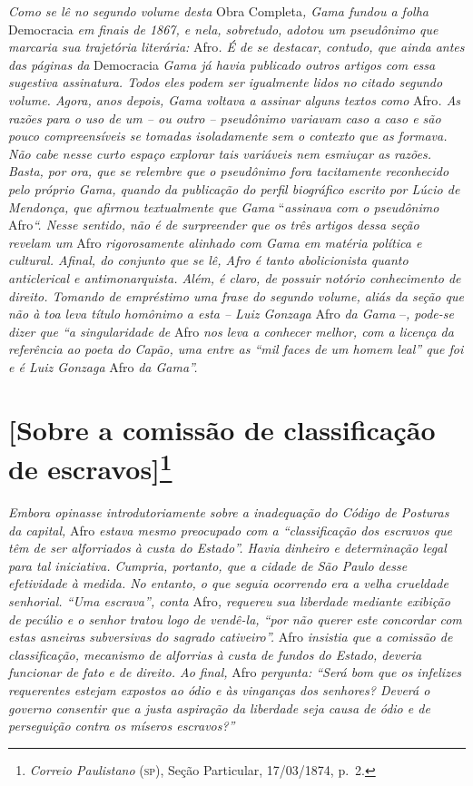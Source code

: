 \begin{argumento}
\emph{Como se lê no segundo volume desta} Obra Completa\emph{, Gama
fundou a folha} Democracia \emph{em finais de 1867, e nela, sobretudo,
adotou um pseudônimo que marcaria sua trajetória literária:} Afro\emph{.
É de se destacar, contudo, que ainda antes das páginas da} Democracia
\emph{Gama já havia publicado outros artigos com essa sugestiva
assinatura. Todos eles podem ser igualmente lidos no citado segundo
volume. Agora, anos depois, Gama voltava a assinar alguns textos como}
Afro\emph{. As razões para o uso de um -- ou outro -- pseudônimo
variavam caso a caso e são pouco compreensíveis se tomadas isoladamente
sem o contexto que as formava. Não cabe nesse curto espaço explorar tais
variáveis nem esmiuçar as razões. Basta, por ora, que se relembre que o
pseudônimo fora tacitamente reconhecido pelo próprio Gama, quando da
publicação do perfil biográfico escrito por Lúcio de Mendonça, que
afirmou textualmente que Gama} ``\emph{assinava com o pseudônimo}
Afro\emph{``. Nesse sentido, não é de surpreender que os três artigos
dessa seção revelam um} Afro \emph{rigorosamente alinhado com Gama em
matéria política e cultural. Afinal, do conjunto que se lê, Afro é
tanto} \emph{abolicionista quanto anticlerical e antimonarquista. Além,
é claro, de possuir notório conhecimento de direito. Tomando de
empréstimo uma frase do segundo volume, aliás da seção que não à toa
leva título homônimo a esta -- Luiz Gonzaga} Afro \emph{da Gama}
--\emph{, pode-se dizer que ``a singularidade de} Afro \emph{nos leva a
conhecer melhor, com a licença da referência ao poeta do Capão, uma
entre as ``mil faces de um homem leal'' que foi e é Luiz Gonzaga} Afro
\emph{da Gama''.}
\end{argumento}

\chapter{{[}Sobre a comissão de classificação 
de escravos{]}\footnote{\emph{Correio Paulistano} (\textsc{sp}), Seção Particular, 17/03/1874, p.~2.}} %

\begin{didascalia}
\emph{Embora opinasse introdutoriamente sobre a inadequação do Código de
Posturas da capital,} Afro \emph{estava mesmo preocupado com a
``classificação dos escravos que têm de ser alforriados à custa do
Estado''. Havia dinheiro e determinação legal para tal iniciativa.
Cumpria, portanto, que a cidade de São Paulo desse efetividade à medida.
No entanto, o que seguia ocorrendo era a velha crueldade senhorial. ``Uma
escrava'', conta} Afro\emph{, requereu sua liberdade mediante exibição de
pecúlio e o senhor tratou logo de vendê-la, ``por não querer este
concordar com estas asneiras subversivas do sagrado cativeiro''.} Afro
\emph{insistia que a comissão de classificação, mecanismo de alforrias à
custa de fundos do Estado, deveria funcionar de fato e de direito. Ao
final,} Afro \emph{pergunta: ``Será bom que os infelizes requerentes
estejam expostos ao ódio e às vinganças dos senhores? Deverá o governo
consentir que a justa aspiração da liberdade seja causa de ódio e de
perseguição contra os míseros escravos?''}
\end{didascalia}

